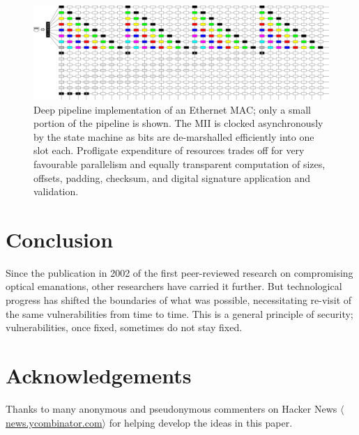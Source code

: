 \documentclass[conference]{IEEEtran}
\newcommand{\URL}[1]{$\langle$\url{#1}$\rangle$}
\begin{document}
\begin{figure}[!t]
    \centering
	\includegraphics[width=\textwidth]{graphics/deep_pipeline.png}
	\caption{Deep pipeline implementation of an Ethernet MAC; only a small
        portion of the pipeline is shown. The MII is clocked asynchronously
        by the state machine as bits are de-marshalled efficiently into one
        slot each. Profligate expenditure of resources trades off for very
        favourable parallelism and equally transparent computation of sizes,
        offsets, padding, checksum, and digital signature application and
        validation.}
	\label{figure:deep_pipeline}
\end{figure}

\section{Conclusion}

Since the publication in 2002 of the first peer-reviewed research on
compromising optical emanations, other researchers have carried it further.
But technological progress has shifted the boundaries of what was possible,
necessitating re-visit of the same vulnerabilities from time to time. This is
a general principle of security; vulnerabilities, once fixed, sometimes do
not stay fixed.

\section*{Acknowledgements}

Thanks to many anonymous and pseudonymous commenters on Hacker News
\URL{news.ycombinator.com} for helping develop the ideas in this paper.






\end{document}
